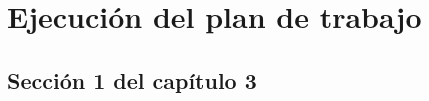 
\chapter{Ejecución del plan de trabajo} %

\label{Chapter3} %


\section{Sección 1 del capítulo 3}


